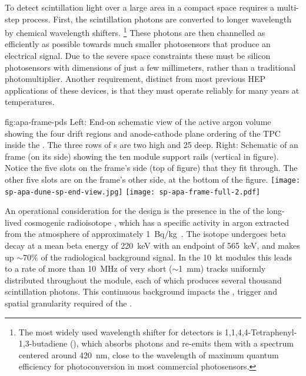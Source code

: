 To detect scintillation light over a large area in a compact space requires a multi-step process.  First, the  scintillation photons are converted to longer wavelength by chemical wavelength shifters. 
\footnote{The most widely used wavelength shifter for \lar detectors is  1,1,4,4-Tetraphenyl-1,3-butadiene (), 
which absorbs  photons and re-emits them with a spectrum centered around \SI{420}{nm}, close to the wavelength of maximum quantum efficiency for photoconversion in most commercial photosensors.} 
These photons are then channelled as efficiently as possible towards much smaller photosensors that produce an electrical signal. Due to the severe space constraints these must be silicon photosensors with dimensions of just a few millimeters,  rather than a traditional photomultiplier.
Another requirement, distinct from most previous HEP applications of these devices, is that they must operate reliably for many years at \lar temperatures. 

\begin{dunefigure}{fig:apa-frame-pds}
{Left: End-on schematic view of the active argon volume showing the four drift regions and anode-cathode plane ordering of the TPC inside the . The three rows of s are two high and 25 deep. Right: Schematic of an  frame (on its side) showing the ten  module support rails (vertical in figure). Notice the five slots on the frame's side (top of figure) that they fit through. The other five slots are on the frame's other side, at the bottom of the figure.}
\texttt{[image: sp-apa-dune-sp-end-view.jpg]}
\hspace{0.01\textwidth}
\texttt{[image: sp-apa-frame-full-2.pdf]}
\end{dunefigure}


An operational consideration for the  design is the presence in the \lartpc of the long-lived cosmogenic radioisotope , which has a specific activity in argon extracted from the atmosphere of approximately \SI{1}{Bq/kg}~\cite{bkds}. The isotope undergoes beta decay at a mean beta energy of \SI{220}{keV} with an endpoint of \SI{565}{keV}, and makes up $\sim$70\% of the radiological background signal.
In the \SI{10}{kt}  modules this leads to a rate of more than \SI{10}{MHz} of very short ($\sim$\SI{1}{mm}) tracks uniformly distributed throughout the module, each of which produces several thousand  scintillation photons. This continuous background impacts the , trigger and spatial granularity required of the .


